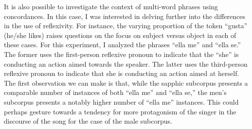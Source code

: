 \documentclass[
  letterpaper,
  DIV=11,
  numbers=noendperiod]{scrartcl}
\begin{document}
It is also possible to investigate the context of multi-word phrases
using concordances. In this case, I was interested in delving further
into the differences in the use of reflexivity. For instance, the
varying proportion of the token ``gusta'' (he/she likes) raises
questions on the focus on subject versus object in each of these cases.
For this experiment, I analyzed the phrases ``ella me'' and ``ella se.''
The former uses the first-person reflexive pronoun to indicate that the
``she'' is conducting an action aimed towards the speaker. The latter
uses the third-person reflexive pronoun to indicate that she is
conducting an action aimed at herself. The first observation we can make
is that, while the sapphic subcorpus presents a comparable number of
instances of both ``ella me'' and ``ella se,'' the men's subcorpus
presents a notably higher number of ``ella me'' instances. This could
perhaps gesture towards a tendency for more protagonism of the singer in
the discourse of the song for the case of the male subcorpus.
\end{document}
